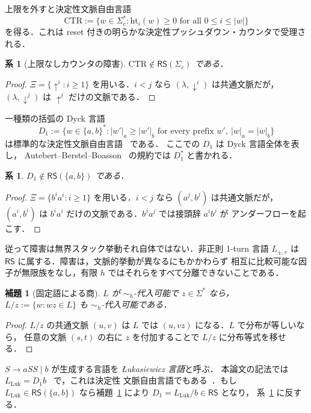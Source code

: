 \documentclass[11pt,a4paper]{ltjsarticle}
\newtheorem{lemma}[theorem]{補題}
\newtheorem{corollary}[theorem]{系}
\theoremstyle{remark}
\theoremstyle{plain}
\begin{document}
上限を外すと決定性文脈自由言語
\[
\mathrm{CTR}:=
\{w\in\Sigma_c^*: \mathrm{ht}_i(w)\ge0
\text{ for all }0\le i\le|w|\}
\]
を得る．これは reset 付きの明らかな決定性プッシュダウン・カウンタで受理される．

\begin{corollary}[上限なしカウンタの障害]
$\mathrm{CTR}\notin\mathsf{RS}(\Sigma_c)$ である．
\end{corollary}
\begin{proof}
$\Xi=\{\uparrow^i:i\ge1\}$ を用いる．$i<j$ なら
$(\lambda,\downarrow^i)$ は共通文脈だが，
$(\lambda,\downarrow^j)$ は $\uparrow^j$ だけの文脈である．
\end{proof}

一種類の括弧の Dyck 言語
\[
 D_1:=\{w\in\{a,b\}^*: |w'|_a\ge|w'|_b
 \text{ for every prefix }w',\ |w|_a=|w|_b\}
\]
は標準的な決定性文脈自由言語~\cite{ginsburg-greibach1966} である．
ここでの $D_1$ は Dyck 言語全体を表し，
Autebert--Berstel--Boasson~\cite{autebert1997} の規約では $D_1^*$ と書かれる．

\begin{corollary}\label{cor:dyck-not-rs}
$D_1\notin\mathsf{RS}(\{a,b\})$ である．
\end{corollary}
\begin{proof}
$\Xi=\{b^ia^i:i\ge1\}$ を用いる．$i<j$ なら $(a^j,b^j)$ は共通文脈だが，
$(a^i,b^i)$ は $b^ia^i$ だけの文脈である．$b^ja^j$ では接頭辞 $a^ib^j$ が
アンダーフローを起こす．
\end{proof}

従って障害は無界スタック挙動それ自体ではない．非正則 1-turn 言語
$L_{\pm,e}$ は $\mathsf{RS}$ に属する．障害は，文脈的挙動が異なるにもかかわらず
相互に比較可能な因子が無限族をなし，有限 $h$ ではそれらをすべて分離できないことである．

\begin{lemma}[固定語による商]\label{lem:rs-fixed-quotient}
$L$ が $\sim_h$-代入可能で $z\in\Sigma^*$ なら，
$L/z:=\{w:wz\in L\}$ も $\sim_h$-代入可能である．
\end{lemma}
\begin{proof}
$L/z$ の共通文脈 $(u,v)$ は $L$ では $(u,vz)$ になる．$L$ で分布が等しいなら，
任意の文脈 $(s,t)$ の右に $z$ を付加することで $L/z$ に分布等式を移せる．
\end{proof}

$S\to aSS\mid b$ が生成する言語を \emph{Łukasiewicz 言語}と呼ぶ．
本論文の記法では $L_{\mathrm{Luk}}=D_1b$~\cite{autebert1997} で，これは決定性
文脈自由言語でもある~\cite{ginsburg-greibach1966}．もし
$L_{\mathrm{Luk}}\in\mathsf{RS}(\{a,b\})$ なら補題~\ref{lem:rs-fixed-quotient} により
$D_1=L_{\mathrm{Luk}}/b\in\mathsf{RS}$ となり，
系~\ref{cor:dyck-not-rs} に反する．
\end{document}
